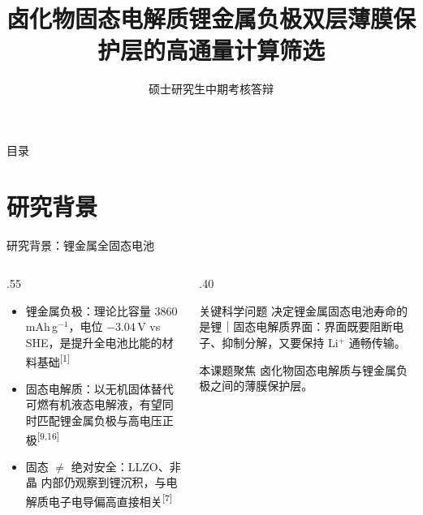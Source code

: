 \documentclass[aspectratio=169,10pt]{beamer}
\title[硕士生中期考核答辩]{卤化物固态电解质锂金属负极双层薄膜保护层的高通量计算筛选}
\subtitle{硕士研究生中期考核答辩}
\date{}
\renewcommand{\cite}[1]{\textsuperscript{\color{NJUMuted}[#1]}}
\begin{document}
\NJUtitleframe

\begin{frame}{目录}
  \tableofcontents
\end{frame}

\section{研究背景}

\begin{frame}[t]{研究背景：锂金属全固态电池}
\begin{columns}[T,onlytextwidth]
  \begin{column}{.55\textwidth}
    \begin{itemize}
      \item \alert{锂金属负极}：理论比容量 3860\,mAh\,g$^{-1}$，电位 $-3.04$\,V vs SHE，是提升全电池比能的材料基础\cite{1}
      \item \alert{固态电解质}：以无机固体替代可燃有机液态电解液，有望同时匹配锂金属负极与高电压正极\cite{9,16}
      \item 固态 $\neq$ 绝对安全：LLZO、非晶  内部仍观察到锂沉积，与电解质电子电导偏高直接相关\cite{7}
    \end{itemize}
  \end{column}
  \begin{column}{.40\textwidth}
    \begin{njuquote}{关键科学问题}
      决定锂金属固态电池寿命的是\alert{锂｜固态电解质界面}：界面既要阻断电子、抑制分解，又要保持 Li$^+$ 通畅传输。
    \end{njuquote}
    \begin{njuquotegold}{本课题聚焦}
      卤化物固态电解质与锂金属负极之间的\alert{薄膜保护层}。
    \end{njuquotegold}
  \end{column}
\end{columns}
\end{frame}
\end{document}
